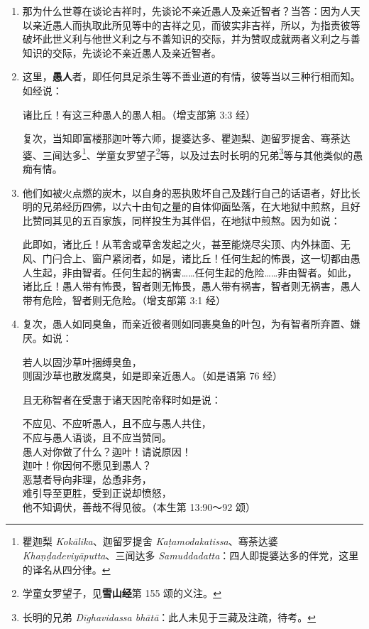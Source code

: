 \begin{enumerate}
\item 那为什么世尊在谈论吉祥时，先谈论不亲近愚人及亲近智者？当答：因为人天以亲近愚人而执取此所见等中的吉祥之见，而彼实非吉祥，所以，为指责彼等破坏此世义利与他世义利之与不善知识的交际，并为赞叹成就两者义利之与善知识的交际，先谈论不亲近愚人及亲近智者。
\item 这里，\textbf{愚人}者，即任何具足杀生等不善业道的有情，彼等当以三种行相而知。如经说：\begin{quoting}诸比丘！有这三种愚人的愚人相。（增支部第 3:3 经）\end{quoting}复次，当知即富楼那迦叶等六师，提婆达多、瞿迦梨、迦留罗提舍、骞荼达婆、三闻达多\footnote{瞿迦梨 \textit{Kokālika}、迦留罗提舍 \textit{Kaṭamodakatissa}、骞荼达婆 \textit{Khaṇḍadeviyāputta}、三闻达多 \textit{Samuddadatta}：四人即提婆达多的伴党，这里的译名从四分律。}、学童女罗望子\footnote{学童女罗望子，见\textbf{雪山经}第 155 颂的义注。}等，以及过去时长明的兄弟\footnote{长明的兄弟 \textit{Dīghavidassa bhātā}：此人未见于三藏及注疏，待考。}等与其他类似的愚痴有情。
\item 他们如被火点燃的炭木，以自身的恶执败坏自己及践行自己的话语者，好比长明的兄弟经历四佛，以六十由旬之量的自体仰面坠落，在大地狱中煎熬，且好比赞同其见的五百家族，同样投生为其伴侣，在地狱中煎熬。因为如说：\begin{quoting}此即如，诸比丘！从苇舍或草舍发起之火，甚至能烧尽尖顶、内外抹面、无风、门闩合上、窗户紧闭者，如是，诸比丘！任何生起的怖畏，这一切都由愚人生起，非由智者。任何生起的祸害……任何生起的危险……非由智者。如此，诸比丘！愚人带有怖畏，智者则无怖畏，愚人带有祸害，智者则无祸害，愚人带有危险，智者则无危险。（增支部第 3:1 经）\end{quoting}
\item 复次，愚人如同臭鱼，而亲近彼者则如同裹臭鱼的叶包，为有智者所弃置、嫌厌。如说：\begin{quoting}若人以固沙草叶捆缚臭鱼，\\则固沙草也散发腐臭，如是即亲近愚人。（如是语第 76 经）\end{quoting}且无称智者在受惠于诸天因陀帝释时如是说：\begin{quoting}不应见、不应听愚人，且不应与愚人共住，\\不应与愚人语谈，且不应当赞同。\\愚人对你做了什么？迦叶！请说原因！\\迦叶！你因何不愿见到愚人？\\恶慧者导向非理，怂恿非务，\\难引导至更胜，受到正说却愤怒，\\他不知调伏，善哉不得见彼。（本生第 13:90～92 颂）\end{quoting}

\end{enumerate}
